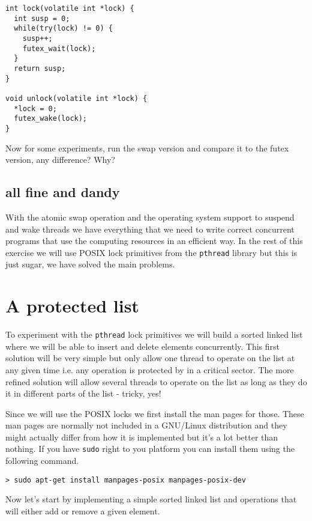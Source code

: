 \documentclass[a4paper,11pt]{article}
\begin{document}
\begin{lstlisting}
int lock(volatile int *lock) {
  int susp = 0;
  while(try(lock) != 0) {
    susp++;
    futex_wait(lock);
  }
  return susp;
}

void unlock(volatile int *lock) {
  *lock = 0;
  futex_wake(lock);
}
\end{lstlisting}

Now for some experiments, run the swap version and compare it to the
futex version, any difference? Why? 

\subsection{all fine and dandy}

With the atomic swap operation and the operating system support to
suspend and wake threads we have everything that we need to write
correct concurrent programs that use the computing resources in an
efficient way. In the rest of this exercise we will use POSIX lock
primitives from the {\tt pthread} library but this is just sugar, we
have solved the main problems.


\section{A protected list}

To experiment with the {\tt pthread} lock primitives we will build a
sorted linked list where we will be able to insert and delete elements
concurrently. This first solution will be very simple but only allow
one thread to operate on the list at any given time i.e. any operation
is protected by in a critical sector. The more refined solution will
allow several threads to operate on the list as long as they do it in
different parts of the list - tricky, yes!

Since we will use the POSIX locks we first install the man pages for
those. These man pages are normally not included in a GNU/Linux
distribution and they might actually differ from how it is
implemented but it's a lot better than nothing. If you have {\tt sudo}
right to you platform you can install them using the following command.

\begin{verbatim}
> sudo apt-get install manpages-posix manpages-posix-dev
\end{verbatim}

Now let's start by implementing a simple sorted linked list and operations
that will either add or remove a given element.
\end{document}
